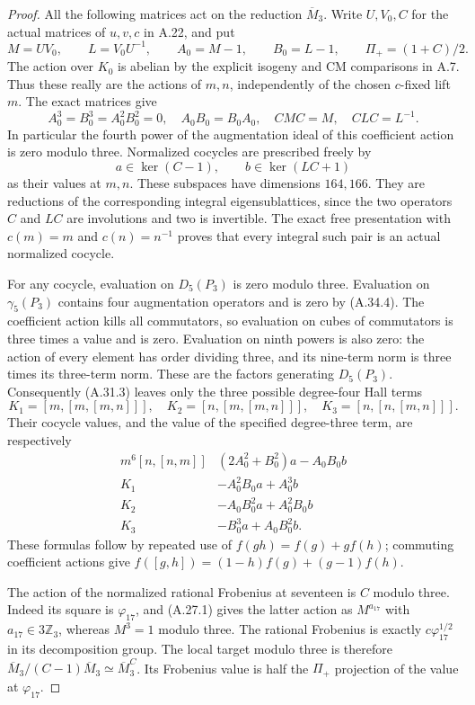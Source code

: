 \begin{proof}
All the following matrices act on the reduction $\overline M_3$.
Write $U,V_0,C$ for the actual matrices of $u,v,c$ in A.22,
and put
\[
 M=UV_0,\qquad L=V_0U^{-1},\qquad
 A_0=M-1,\qquad B_0=L-1,\qquad
 \Pi_+=(1+C)/2.
 \tag{A.34.3}
\]
The action over $K_0$ is abelian by the explicit isogeny
and CM comparisons in A.7. Thus these really are the
actions of $m,n$, independently of the chosen $c$-fixed
lift $m$. The exact matrices give
\[
 A_0^3=B_0^3=A_0^2B_0^2=0,
 \quad A_0B_0=B_0A_0,
 \quad CMC=M,
 \quad CLC=L^{-1}.
 \tag{A.34.4}
\]
In particular the fourth power of the augmentation ideal
of this coefficient action is zero modulo three.
Normalized cocycles are prescribed freely by
\[
       a\in\ker(C-1),\qquad b\in\ker(LC+1)
 \tag{A.34.5}
\]
as their values at $m,n$. These subspaces have dimensions
$164,166$. They are reductions of the corresponding
integral eigensublattices, since the two operators $C$
and $LC$ are involutions and two is invertible.
The exact free presentation with $c(m)=m$ and
$c(n)=n^{-1}$ proves that every integral such pair is
an actual normalized cocycle.

For any cocycle, evaluation on $D_5(P_3)$ is zero modulo
three. Evaluation on $\gamma_5(P_3)$ contains four
augmentation operators and is zero by (A.34.4).
The coefficient action kills all commutators, so evaluation
on cubes of commutators is three times a value and is
zero. Evaluation on ninth powers is also zero: the action
of every element has order dividing three, and its
nine-term norm is three times its three-term norm.
These are the factors generating $D_5(P_3)$.
Consequently (A.31.3) leaves only the three possible
degree-four Hall terms
\[
 K_1=[m,[m,[m,n]]],\quad
 K_2=[n,[m,[m,n]]],\quad
 K_3=[n,[n,[m,n]]].
\]
Their cocycle values, and the value of the specified
degree-three term, are respectively
\[
\begin{array}{c|l}
 m^6[n,[n,m]]&(2A_0^2+B_0^2)a-A_0B_0b\\
 K_1&-A_0^2B_0a+A_0^3b\\
 K_2&-A_0B_0^2a+A_0^2B_0b\\
 K_3&-B_0^3a+A_0B_0^2b.
\end{array}
 \tag{A.34.6}
\]
These formulas follow by repeated use of
$f(gh)=f(g)+g f(h)$; commuting coefficient actions give
$f([g,h])=(1-h)f(g)+(g-1)f(h)$.

The action of the normalized rational Frobenius at
seventeen is $C$ modulo three. Indeed its square is
$\varphi_{17}$, and (A.27.1) gives the latter action as
$M^{a_{17}}$ with $a_{17}\in3\mathbb Z_3$, whereas
$M^3=1$ modulo three. The rational Frobenius is exactly
$c\varphi_{17}^{1/2}$ in its decomposition group.
The local target modulo three is therefore
$\overline M_3/(C-1)\overline M_3\simeq\overline M_3^C$.
Its Frobenius value is half the $\Pi_+$ projection of
the value at $\varphi_{17}$.


\end{proof}
